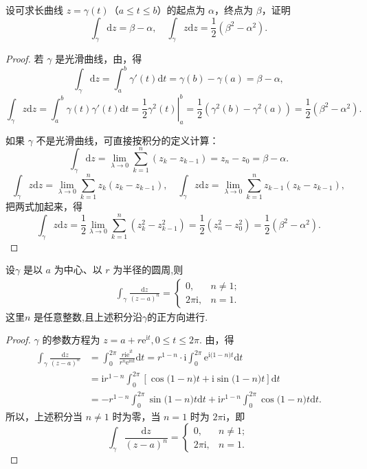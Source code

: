 \documentclass[../../main.tex]{subfiles}%
\begin{document}
\begin{example}\label{example:例3.1.3}
设可求长曲线 \( z = \gamma(t) \)（\( a \leqslant t \leqslant b \)）的起点为 \( \alpha \)，终点为 \( \beta \)，证明
\[
\int_\gamma \mathrm{d}z = \beta - \alpha,
\quad
\int_\gamma z \mathrm{d}z = \frac{1}{2}(\beta^2 - \alpha^2).
\]
\end{example}
\begin{proof}

若 \( \gamma \) 是光滑曲线，由，得
\[
\int_\gamma \mathrm{d}z = \int_a^b \gamma'(t)\mathrm{d}t
= \gamma(b) - \gamma(a)
= \beta - \alpha,
\]
\[
\int_\gamma z \mathrm{d}z = \int_a^b \gamma(t)\gamma'(t)\mathrm{d}t
= \left. \frac{1}{2}\gamma^2(t) \right|_a^b
= \frac{1}{2}(\gamma^2(b) - \gamma^2(a))
= \frac{1}{2}(\beta^2 - \alpha^2).
\]

如果 \( \gamma \) 不是光滑曲线，可直接按积分的定义计算：
\[
\int_\gamma \mathrm{d}z = \lim_{\lambda \to 0} \sum_{k = 1}^n (z_k - z_{k - 1})
= z_n - z_0
= \beta - \alpha.
\]
\[
\int_\gamma z \mathrm{d}z = \lim_{\lambda \to 0} \sum_{k = 1}^n z_k(z_k - z_{k - 1}),
\quad
\int_\gamma z \mathrm{d}z = \lim_{\lambda \to 0} \sum_{k = 1}^n z_{k - 1}(z_k - z_{k - 1}),
\]
把两式加起来，得
\[
\int_\gamma z \mathrm{d}z = \frac{1}{2} \lim_{\lambda \to 0} \sum_{k = 1}^n (z_k^2 - z_{k - 1}^2)
= \frac{1}{2}(z_n^2 - z_0^2)
= \frac{1}{2}(\beta^2 - \alpha^2).
\]
\end{proof}

\begin{proposition}\label{proposition:例3.1.4}
设\( \gamma \) 是以 \( a \) 为中心、以 \( r \) 为半径的圆周,则
\begin{align*}
\int_\gamma \frac{\mathrm{d}z}{(z - a)^n} = 
\begin{cases} 
0, & n \neq 1; \\
2\pi\mathrm{i}, & n = 1.
\end{cases}
\end{align*}
这里\( n \) 是任意整数,且上述积分沿$\gamma$的正方向进行.
\end{proposition}
\begin{proof}
\( \gamma \) 的参数方程为 \( z = a + r\mathrm{e}^{\mathrm{i}t}, 0 \leqslant t \leqslant 2\pi \). 由，得
\begin{align*}
\int_{\gamma}{\frac{\mathrm{d}z}{(z-a)^n}}&=\int_0^{2\pi}{\frac{r\mathrm{ie}^{\mathrm{i}t}}{r^n\mathrm{e}^{\mathrm{i}nt}}\mathrm{d}t}=r^{1-n}\cdot \mathrm{i}\int_0^{2\pi}{\mathrm{e}^{\mathrm{i(}1-n)t}\mathrm{d}t}
\\
&=\mathrm{i}r^{1-n}\int_0^{2\pi}{\left[ \cos\mathrm{(}1-n)t+\mathrm{i}\sin\mathrm{(}1-n)t \right] \mathrm{d}t}
\\
&=-r^{1-n}\int_0^{2\pi}{\sin\mathrm{(}1-n)t\mathrm{d}t}+\mathrm{i}r^{1-n}\int_0^{2\pi}{\cos\mathrm{(}1-n)t\mathrm{d}t}.
\end{align*}
所以，上述积分当 \( n \neq 1 \) 时为零，当 \( n = 1 \) 时为 \( 2\pi\mathrm{i} \)，即
\[
\int_\gamma \frac{\mathrm{d}z}{(z - a)^n} = 
\begin{cases} 
0, & n \neq 1; \\
2\pi\mathrm{i}, & n = 1.
\end{cases}
\]
\end{proof}
\end{document}
